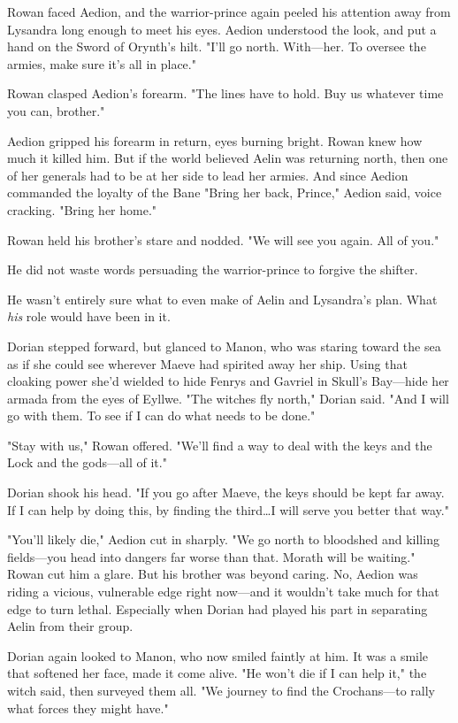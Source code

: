 Rowan faced Aedion, and the warrior-prince again peeled his attention away from Lysandra long enough to meet his eyes.
Aedion understood the look, and put a hand on the Sword of Orynth's hilt.
"I'll go north.
With---her.
To oversee the armies, make sure it's all in place."

Rowan clasped Aedion's forearm.
"The lines have to hold.
Buy us whatever time you can, brother."

Aedion gripped his forearm in return, eyes burning bright.
Rowan knew how much it killed him.
But if the world believed Aelin was returning north, then one of her generals had to be at her side to lead her armies.
And since Aedion commanded the loyalty of the Bane 
"Bring her back, Prince," Aedion said, voice cracking.
"Bring her home."

Rowan held his brother's stare and nodded.
"We will see you again.
All of you."

He did not waste words persuading the warrior-prince to forgive the shifter.

He wasn't entirely sure what to even make of Aelin and Lysandra's plan.
What \emph{his} role would have been in it.

Dorian stepped forward, but glanced to Manon, who was staring toward the sea as if she could see wherever Maeve had spirited away her ship.
Using that cloaking power she'd wielded to hide Fenrys and Gavriel in Skull's Bay---hide her armada from the eyes of Eyllwe.
"The witches fly north," Dorian said.
"And I will go with them.
To see if I can do what needs to be done."

"Stay with us," Rowan offered.
"We'll find a way to deal with the keys and the Lock and the gods---all of it."

Dorian shook his head.
"If you go after Maeve, the keys should be kept far away.
If I can help by doing this, by finding the third\ldots I will serve you better that way."

"You'll likely die," Aedion cut in sharply.
"We go north to bloodshed and killing fields---you head into dangers far worse than that.
Morath will be waiting."
Rowan cut him a glare.
But his brother was beyond caring.
No, Aedion was riding a vicious, vulnerable edge right now---and it wouldn't take much for that edge to turn lethal.
Especially when Dorian had played his part in separating Aelin from their group.

Dorian again looked to Manon, who now smiled faintly at him.
It was a smile that softened her face, made it come alive.
"He won't die if I can help it," the witch said, then surveyed them all.
"We journey to find the Crochans---to rally what forces they might have."

